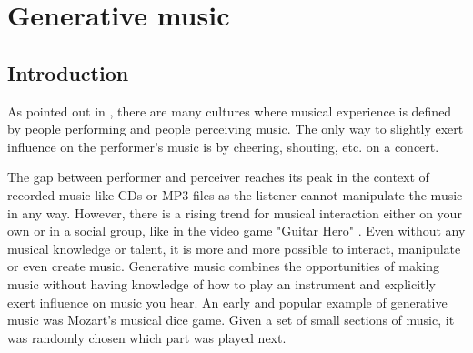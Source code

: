 	 

	\section{Generative music}
	

	\subsection{Introduction}
	As pointed out in \cite{Chandra2012}, there are many cultures where musical experience is defined by people performing and people perceiving music. 
	The only way to slightly exert influence on the performer's music is by cheering, shouting, etc. on a concert. 
	
	The gap between performer and perceiver reaches its peak in the context of recorded music like CDs or MP3 files as the listener cannot manipulate the music in any way. 
	However, there is a rising trend for musical interaction either on your own or in a social group, like in the video game "Guitar Hero" \cite{Chandra2012, Planck2009}. 
	Even without any musical knowledge or talent, it is more and more possible to interact, manipulate or even create music.
	Generative music combines the opportunities of making music without having knowledge of how to play an instrument and explicitly exert influence on music you hear.
	An early and popular example of generative music was Mozart's musical dice game. Given a set of small sections of music, it was randomly chosen which part was played next.


